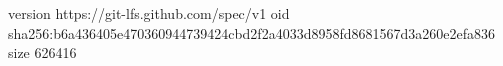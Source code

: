 version https://git-lfs.github.com/spec/v1
oid sha256:b6a436405e470360944739424cbd2f2a4033d8958fd8681567d3a260e2efa836
size 626416
